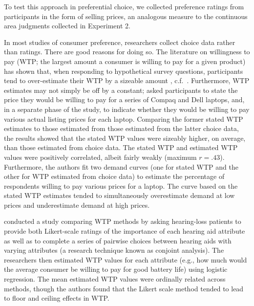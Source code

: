 To test this approach in preferential choice, we collected preference ratings from participants in the form of selling prices, an analogous measure to the continuous area judgments collected in Experiment 2. 

In most studies of consumer preference, researchers collect choice data rather than ratings. There are good reasons for doing so. The literature on willingness to pay (WTP; the largest amount a consumer is willing to pay for a given product) has shown that, when responding to hypothetical survey questions, participants tend to over-estimate their WTP by a sizeable amount \parencite{breidertREVIEWMETHODSMEASURING2006,schmidtAccuratelyMeasuringWillingness2020}, c.f.~\textcite{miller2011should}. Furthermore, WTP estimates may not simply be off by a constant; \textcite{jedidi2002augmenting} asked participants to state the price they would be willing to pay for a series of Compaq and Dell laptops, and, in a separate phase of the study, to indicate whether they would be willing to pay various actual listing prices for each laptop. Comparing the former stated WTP estimates to those estimated from those estimated from the latter choice data, the results showed that the stated WTP values were sizeably higher, on average, than those estimated from choice data. The stated WTP and estimated WTP values were positively correlated, albeit fairly weakly (maximum $r=.43$). Furthermore, the authors fit two demand curves (one for stated WTP and the other for WTP estimated from choice data) to estimate the percentage of respondents willing to pay various prices for a laptop. The curve based on the stated WTP estimates tended to simultaneously overestimate demand at low prices and underestimate demand at high prices.

\textcite{bridges2012consumer} conducted a study comparing WTP methods by asking hearing-loss patients to provide both Likert-scale ratings of the importance of each hearing aid attribute as well as to complete a series of pairwise choices between hearing aids with varying attributes (a research technique known as conjoint analysis). The researchers then estimated WTP values for each attribute (e.g., how much would the average consumer be willing to pay for good battery life) using logistic regression. The mean estimated WTP values were ordinally related across methods, though the authors found that the Likert scale method tended to lead to floor and ceiling effects in WTP. 

